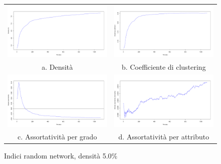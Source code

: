\documentclass[a4paper,12pt]{article}
\begin{document}
\begin{figure}[H]
\begin{tabular}{cc}
  \includegraphics[width=81mm]{images/evolution_1000_rnd_1080_5_0.pdf} &   \includegraphics[width=81mm]{images/clustering_1000_rnd_1080_5_0.pdf} \\
a. Densità & b. Coefficiente di clustering \\[6pt]
 \includegraphics[width=81mm]{images/deg_assortativity_1000_rnd_1080_5_0.pdf} &   \includegraphics[width=81mm]{images/homophily_1000_rnd_1080_5_0.pdf} \\
c. Assortatività per grado & d. Assortatività per attributo \\[6pt]
\end{tabular}
\centering
\caption{Indici random network, densità 5.0\%}
\end{figure}
\end{document}
